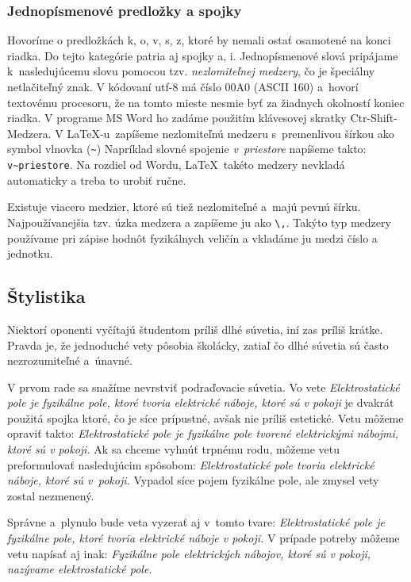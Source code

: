 \subsubsection{Jednopísmenové predložky a spojky}
Hovoríme o predložkách k, o, v, s, z,
ktoré by nemali ostať osamotené na konci riadka.
Do tejto kategórie patria aj spojky a, i.
Jednopísmenové slová pripájame k~nasledujúcemu slovu pomocou
tzv. \emph{nezlomiteľnej medzery},
čo je špeciálny netlačiteľný znak.
V kódovaní utf-8 má číslo 00A0 (ASCII 160)
a~hovorí textovému procesoru,
že na tomto mieste nesmie byť za žiadnych okolností
koniec riadka.
V programe MS Word ho zadáme použitím klávesovej skratky
Ctr-Shift-Medzera.
V \LaTeX-u\ zapíšeme nezlomiteľnú medzeru s~premenlivou šírkou 
ako symbol vlnovka (\verb|~|)
Napríklad slovné spojenie \emph{v~priestore} napíšeme takto: 
\verb|v~priestore|.
Na rozdiel od Wordu, \LaTeX\ takéto medzery nevkladá automaticky
a treba to urobiť ručne.

Existuje viacero medzier, ktoré sú tiež nezlomiteľné a~majú pevnú šírku.
Najpoužívanejšia tzv. úzka medzera a zapíšeme ju ako \verb|\,|.
Takýto typ medzery používame pri zápise hodnôt fyzikálnych veličín a vkladáme ju medzi číslo a jednotku.

\subsection{Štylistika}
Niektorí oponenti vyčítajú študentom príliš dlhé súvetia,
iní zas príliš krátke.
Pravda je, že jednoduché vety pôsobia školácky,
zatiaľ čo dlhé súvetia sú často nezrozumiteľné a~únavné.

V prvom rade sa snažíme nevrstviť podraďovacie súvetia.
Vo vete \emph{Elektrostatické pole je fyzikálne pole,
ktoré tvoria elektrické náboje, ktoré sú v pokoji}
je dvakrát použitá spojka ktoré,
čo je síce prípustné, avšak nie príliš estetické.
Vetu môžeme opraviť takto: 
\emph{Elektrostatické pole je fyzikálne
pole tvorené elektrickými nábojmi, ktoré sú v pokoji.} 
Ak sa chceme vyhnúť trpnému rodu,
môžeme vetu preformulovať nasledujúcim spôsobom:
\emph{Elektrostatické pole tvoria elektrické náboje,
ktoré sú v~pokoji.}
Vypadol síce pojem fyzikálne pole,
ale zmysel vety zostal nezmenený.

Správne a~plynulo bude veta vyzerať aj v~tomto tvare: 
\emph{Elektrostatické pole je fyzikálne pole,
ktoré tvoria elektrické náboje v pokoji.}
V prípade potreby môžeme vetu napísať aj inak:
\emph{Fyzikálne pole elektrických nábojov,
ktoré sú v pokoji, nazývame elektrostatické pole.}

